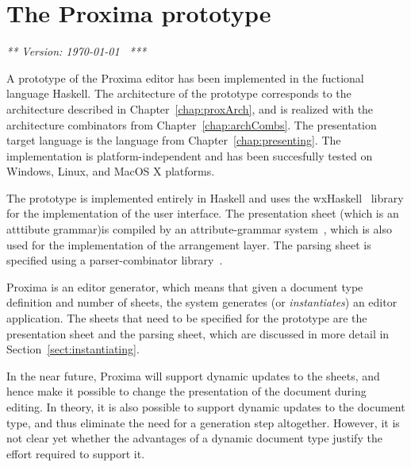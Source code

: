 \chapter{The Proxima prototype} \label{chap:prototype}

{\em *** Version: \today~ ***}

\newcommand{\epsfigPrx}[3]{\epsfig{file=pics/Screenshots/#1, height=#3mm}}


A prototype of the Proxima editor has been implemented in the fuctional language Haskell. The architecture of the prototype corresponds to the architecture described in Chapter~\ref{chap:proxArch}, and is realized with the architecture combinators from Chapter~\ref{chap:archCombs}. The presentation target language is the {\Xprez} language from Chapter~\ref{chap:presenting}. The implementation is platform-independent and has been succesfully tested on Windows, Linux, and MacOS X platforms. 

The prototype is implemented entirely in Haskell and uses the wxHaskell~\cite{leijen04wxHaskell} library for the implementation of the user interface. The presentation sheet \bc (which is an atttibute grammar)\ec  is compiled by an  attribute-grammar system~\cite{swierstra04ag}, which is also used for the implementation of the arrangement layer. The parsing sheet is specified using a parser-combinator library~\cite{swierstra01parsers}.


Proxima is an editor generator, which means that given a document type definition and number of sheets, the system generates (or {\em instantiates}) an editor application. The sheets that need to be specified for the prototype are the presentation sheet and the parsing sheet, which are discussed in more detail in Section~\ref{sect:instantiating}.

In the near future, Proxima will support dynamic updates to the sheets, and hence make it possible to change the presentation of the document during editing. In theory, it is also possible to support dynamic updates to the document type, and thus eliminate the need for a generation step altogether. However, it is not clear yet whether the advantages of a dynamic document type justify the effort required to support it. 


